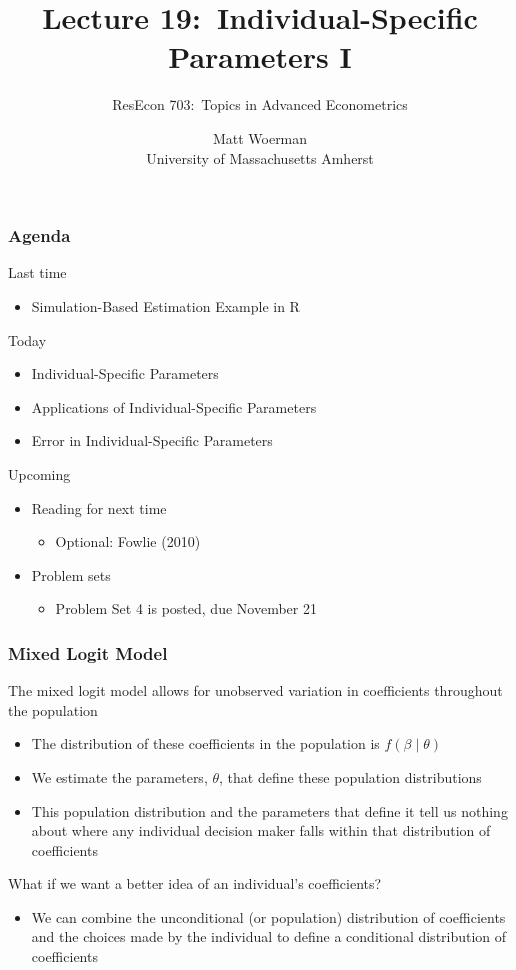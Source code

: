 \documentclass{beamer}\usepackage[]{graphicx}\usepackage[]{color}
\title[Lecture 19:\ Individual-Specific Parameters I]{Lecture 19:\ Individual-Specific Parameters I}
\author[ResEcon 703:\ Advanced Econometrics]{ResEcon 703:\ Topics in Advanced Econometrics}
\date{Matt Woerman\\University of Massachusetts Amherst}
\begin{document}
{ 
\begin{frame}[noframenumbering]
    \titlepage
\end{frame}
}

\begin{frame}\frametitle{Agenda}
    Last time
    \begin{itemize}
        \item Simulation-Based Estimation Example in R
    \end{itemize}
    \vspace{2ex}
    Today
    \begin{itemize}
    	\item Individual-Specific Parameters
    	\item Applications of Individual-Specific Parameters
    	\item Error in Individual-Specific Parameters
    \end{itemize}
    \vspace{2ex}
    Upcoming
    \begin{itemize}
        \item Reading for next time
        \begin{itemize}
            \item Optional: Fowlie (2010)
        \end{itemize}
        \item Problem sets
        \begin{itemize}
            \item Problem Set 4 is posted, due November 21
        \end{itemize}
    \end{itemize}
\end{frame}

\begin{frame}\frametitle{Mixed Logit Model}
    The mixed logit model allows for unobserved variation in coefficients throughout the population
    \begin{itemize}
        \item The distribution of these coefficients in the population is $f(\beta \mid \theta)$
        \item We estimate the parameters, $\theta$, that define these population distributions
        \item This population distribution and the parameters that define it tell us nothing about where any individual decision maker falls within that distribution of coefficients
    \end{itemize}
    \vspace{3ex}
    What if we want a better idea of an individual's coefficients?
    \begin{itemize}
        \item We can combine the unconditional (or population) distribution of coefficients and the choices made by the individual to define a conditional distribution of coefficients
    \end{itemize}
\end{frame}
\end{document}
